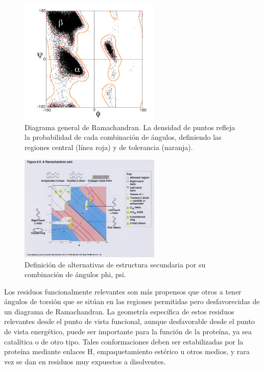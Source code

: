 \begin{figure}[h]
\centering
\includegraphics[width = 0.6\textwidth]{figs/Ramachandran_plot_general_100K.jpg}
\caption{Diagrama general de Ramachandran. La densidad de puntos refleja la probabilidad de cada combinación de ángulos, definiendo las regiones central (línea roja) y de tolerancia (naranja).}
\label{fig:ramachandran}
\end{figure}

\begin{figure}[h]
\centering
\includegraphics[width = 0.6\textwidth]{figs/rama2.png}
\caption{Definición de alternativas de estructura secundaria por su combinación de ángulos phi, psi.}
\label{fig:ramachandran2}
\end{figure}

Los residuos funcionalmente relevantes son más propensos que otros a tener ángulos de torsión que se sitúan en las regiones permitidas pero desfavorecidas de un diagrama de Ramachandran. La geometría específica de estos residuos relevantes desde el punto de vista funcional, aunque desfavorable desde el punto de vista energético, puede ser importante para la función de la proteína, ya sea catalítica o de otro tipo. Tales conformaciones deben ser estabilizadas por la proteína mediante enlaces H, empaquetamiento estérico u otros medios, y rara vez se dan en residuos muy expuestos a disolventes.


